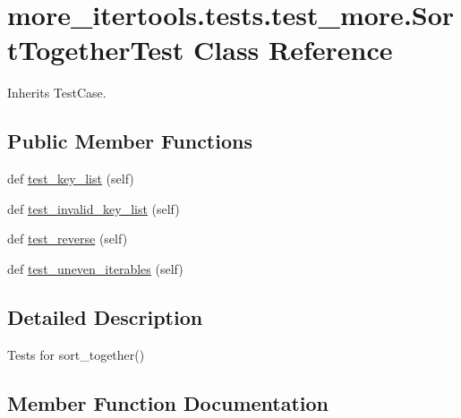 \hypertarget{classmore__itertools_1_1tests_1_1test__more_1_1_sort_together_test}{}\section{more\+\_\+itertools.\+tests.\+test\+\_\+more.\+Sort\+Together\+Test Class Reference}
\label{classmore__itertools_1_1tests_1_1test__more_1_1_sort_together_test}


Inherits Test\+Case.

\subsection*{Public Member Functions}
\begin{DoxyCompactItemize}
\item 
def \hyperlink{classmore__itertools_1_1tests_1_1test__more_1_1_sort_together_test_af383e5ffff73faa915749e0c4fdecc3f}{test\+\_\+key\+\_\+list} (self)
\item 
def \hyperlink{classmore__itertools_1_1tests_1_1test__more_1_1_sort_together_test_a3c23596fd4a37c476bd5502194ba7fbb}{test\+\_\+invalid\+\_\+key\+\_\+list} (self)
\item 
def \hyperlink{classmore__itertools_1_1tests_1_1test__more_1_1_sort_together_test_a72566ecfef8dbcb942651aac5a1c0a56}{test\+\_\+reverse} (self)
\item 
def \hyperlink{classmore__itertools_1_1tests_1_1test__more_1_1_sort_together_test_ad3bd77fc9749e6359d3d5d5f706e43ac}{test\+\_\+uneven\+\_\+iterables} (self)
\end{DoxyCompactItemize}


\subsection{Detailed Description}
\begin{DoxyVerb}Tests for sort_together()\end{DoxyVerb}
 

\subsection{Member Function Documentation}
\mbox{\label{classmore__itertools_1_1tests_1_1test__more_1_1_sort_together_test_a3c23596fd4a37c476bd5502194ba7fbb}} 
